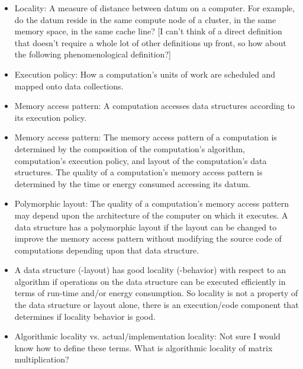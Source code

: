 \begin{itemize}
\begin{itemize}
  \item {} Locality: A measure of distance between datum on a computer.  For example, do the datum reside in the same compute node of a cluster, in the same memory space, in the same cache line?  [I can't think of a direct definition that doesn't require a whole lot of other definitions up front, so how about the following phenomenological definition?]

  \item Execution policy: How a computation's units of work are scheduled and mapped onto data collections. 

  \item Memory access pattern: A computation accesses data structures according to its execution policy. 

  \item Memory access pattern: The memory access pattern of a computation is determined by the composition of the computation's algorithm, computation's execution policy, and layout of the computation's data structures.  The quality of a computation's memory access pattern is determined by the time or energy consumed accessing its datum.  

  \item Polymorphic layout: The quality of a computation's memory access pattern may depend upon the architecture of the computer on which it executes.  A data structure has a polymorphic layout if the layout can be changed to improve the memory access pattern without modifying the source code of computations depending upon that data structure.

  \item A data structure (-layout) has good locality (-behavior) with respect to an algorithm if operations on the data structure can be executed efficiently in terms of run-time and/or energy consumption. So locality is not a property of the data structure or layout alone, there is an execution/code component that determines if locality behavior is good.

  \item Algorithmic locality vs. actual/implementation locality: Not sure I would know how to define these terms. What is algorithmic locality of matrix multiplication? 


\end{itemize}
\end{itemize}
